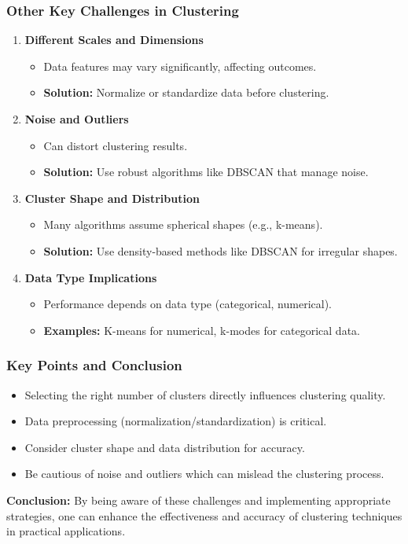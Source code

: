 \documentclass[aspectratio=169]{beamer}
\begin{document}
\begin{frame}[fragile]
  \frametitle{Other Key Challenges in Clustering}
  
  \begin{enumerate}
    \item \textbf{Different Scales and Dimensions}
      \begin{itemize}
        \item Data features may vary significantly, affecting outcomes.
        \item \textbf{Solution:} Normalize or standardize data before clustering.
      \end{itemize}
  
    \item \textbf{Noise and Outliers}
      \begin{itemize}
        \item Can distort clustering results.
        \item \textbf{Solution:} Use robust algorithms like DBSCAN that manage noise.
      \end{itemize}

    \item \textbf{Cluster Shape and Distribution}
      \begin{itemize}
        \item Many algorithms assume spherical shapes (e.g., k-means).
        \item \textbf{Solution:} Use density-based methods like DBSCAN for irregular shapes.
      \end{itemize}

    \item \textbf{Data Type Implications}
      \begin{itemize}
        \item Performance depends on data type (categorical, numerical).
        \item \textbf{Examples:} K-means for numerical, k-modes for categorical data.
      \end{itemize}
  \end{enumerate}
\end{frame}

\begin{frame}[fragile]
  \frametitle{Key Points and Conclusion}
  
  \begin{itemize}
    \item Selecting the right number of clusters directly influences clustering quality.
    \item Data preprocessing (normalization/standardization) is critical.
    \item Consider cluster shape and data distribution for accuracy.
    \item Be cautious of noise and outliers which can mislead the clustering process.
  \end{itemize}

  \textbf{Conclusion:} By being aware of these challenges and implementing appropriate strategies, one can enhance the effectiveness and accuracy of clustering techniques in practical applications.
\end{frame}
\end{document}
